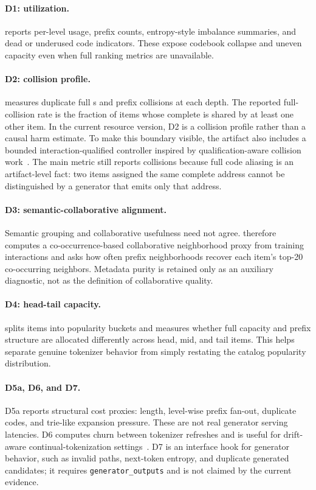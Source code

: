 \paragraph{D1: utilization.}
\tool reports per-level usage, prefix counts, entropy-style imbalance
summaries, and dead or underused code indicators. These expose codebook
collapse and uneven capacity even when full ranking metrics are unavailable.

\paragraph{D2: collision profile.}
\tool measures duplicate full \sid{}s and prefix collisions at each depth. The
reported full-collision rate is the fraction of items whose complete \sid is
shared by at least one other item. In the current resource version, D2 is a
collision profile rather than a causal harm estimate. To make this boundary
visible, the artifact also includes a bounded interaction-qualified controller
inspired by qualification-aware collision work~\cite{hu2026quasid}. The main
metric still reports collisions because full code aliasing is an artifact-level
fact: two items assigned the same complete address cannot be distinguished by a
generator that emits only that address.

\paragraph{D3: semantic-collaborative alignment.}
Semantic grouping and collaborative usefulness need not agree. \tool therefore
computes a co-occurrence-based collaborative neighborhood proxy from training
interactions and asks how often prefix neighborhoods recover each item's top-20
co-occurring neighbors. Metadata purity is retained only as an auxiliary
diagnostic, not as the definition of collaborative quality.

\paragraph{D4: head-tail capacity.}
\tool splits items into popularity buckets and measures whether full \sid
capacity and prefix structure are allocated differently across head, mid, and
tail items. This helps separate genuine tokenizer behavior from simply
restating the catalog popularity distribution.

\paragraph{D5a, D6, and D7.}
D5a reports structural cost proxies: \sid length, level-wise prefix fan-out,
duplicate codes, and trie-like expansion pressure. These are not real generator
serving latencies. D6 computes churn between tokenizer refreshes and is useful for
drift-aware continual-tokenization settings~\cite{feng2026dact}. D7 is an
interface hook for generator behavior, such as invalid paths, next-token
entropy, and duplicate generated candidates; it requires
\texttt{generator\_outputs} and is not claimed by the current evidence.

